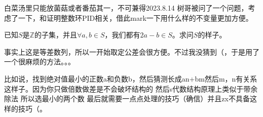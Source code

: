 \begin{diary}{白菜汤里只能放菌菇或者番茄其一，不可兼得}{2023.8.14}
    树哥被问了一个问题，考虑了一下，和证明整数环PID相关，借此mark一下用什么样的不变量更加方便。

    已知$S$是$\mathbb{Z}$的子集，并且$\forall a,b \in S$，我们都有$2a-b \in S$。求问$S$的样子。

    事实上这是等差数列，所以一开始取定公差会很方便。不过我没猜到（，于是用了一个很麻烦的方法。。。

    比如说，找到绝对值最小的正数a和负数b，然后猜测长成an+bm然后m，n有关系这样子。因为你只做倍数做差是不会破坏结构的 然后s代数结构原理上类似于带余除法 所以选最小的两个数
    最后就需要一点点处理的技巧（确信）并且zx不具备这样的技巧（。

\end{diary}